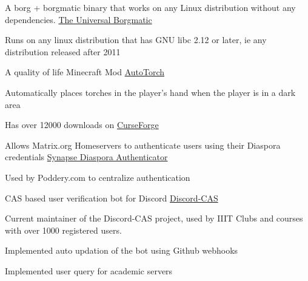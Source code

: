 
\begin{cventries}
  \cventry
    {A borg + borgmatic binary that works on any Linux distribution without any dependencies.} %
    {\href{https://github.com/necessary129/the-universal-borgmatic}{The Universal Borgmatic}} %
    {} %
    {} %
    {
      \begin{cvitems} %
		\item {Runs on any linux distribution that has GNU libc 2.12 or later, ie any distribution released after 2011}
      \end{cvitems}
    }

	
	\cventry
    {A quality of life Minecraft Mod} %
    {\href{https://www.curseforge.com/minecraft/mc-mods/auto-torch}{AutoTorch}} %
    {} %
    {} %
    {
      \begin{cvitems} %
        \item {Automatically places torches in the player's hand when the player is in a dark area}
        \item {Has over 12000 downloads on \href{https://www.curseforge.com/minecraft/mc-mods/auto-torch}{CurseForge}}
	\end{cvitems}
    }
	
	\cventry
	{Allows Matrix.org Homeservers to authenticate users using their Diaspora credentials} %
	{\href{https://matrix.org/docs/projects/other/synapse-diaspora-auth}{Synapse Diaspora Authenticator}} %
	{} %
	{} %
	{
	  \begin{cvitems} %
		\item {Used by Poddery.com to centralize authentication}
	  \end{cvitems}
	}
  \cventry
    {CAS based user verification bot for Discord} %
    {\href{https://github.com/Opensource-IIITH/Discord-CAS}{Discord-CAS}} %
    {} %
    {} %
    {
      \begin{cvitems} %
      	\item {Current maintainer of the Discord-CAS project, used by IIIT Clubs and courses with over 1000 registered users.}
		\item {Implemented auto updation of the bot using Github webhooks}
		\item {Implemented user query for academic servers}
      \end{cvitems}
    }
\end{cventries}
